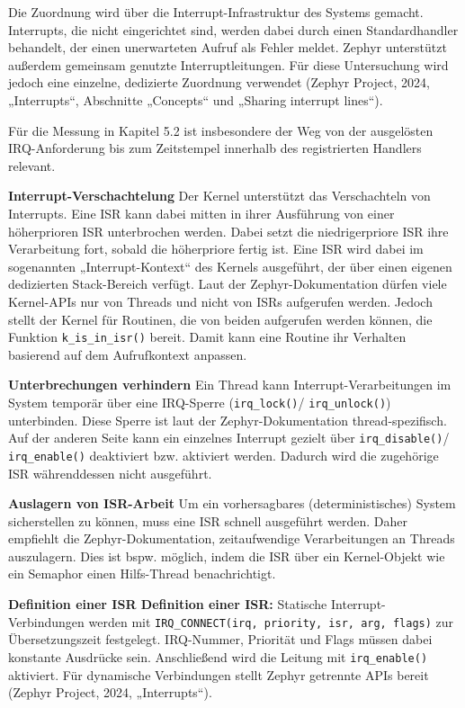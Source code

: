 Die Zuordnung wird über die Interrupt-Infrastruktur des Systems gemacht. Interrupts, die nicht eingerichtet sind, werden dabei durch einen Standardhandler behandelt, der einen unerwarteten Aufruf als Fehler meldet. Zephyr unterstützt außerdem gemeinsam genutzte Interruptleitungen. Für diese Untersuchung wird jedoch eine einzelne, dedizierte Zuordnung verwendet (Zephyr Project, 2024, „Interrupts“, Abschnitte „Concepts“ und „Sharing interrupt lines“).

Für die Messung in Kapitel 5.2 ist insbesondere der Weg von der ausgelösten IRQ-Anforderung bis zum Zeitstempel innerhalb des registrierten Handlers relevant.

\textbf{Interrupt-Verschachtelung }Der Kernel unterstützt das Verschachteln von Interrupts. Eine ISR kann dabei mitten in ihrer Ausführung von einer höherprioren ISR unterbrochen werden. Dabei setzt die niedrigerpriore ISR ihre Verarbeitung fort, sobald die höherpriore fertig ist. Eine ISR wird dabei im sogenannten „Interrupt-Kontext“ des Kernels ausgeführt, der über einen eigenen dedizierten Stack-Bereich verfügt. Laut der Zephyr-Dokumentation dürfen viele Kernel-APIs nur von Threads und nicht von ISRs aufgerufen werden. Jedoch stellt der Kernel für Routinen, die von beiden aufgerufen werden können, die Funktion \lstinline[style=fileinline]|k_is_in_isr()| bereit. Damit kann eine Routine ihr Verhalten basierend auf dem Aufrufkontext anpassen.

\textbf{Unterbrechungen verhindern }Ein Thread kann Interrupt-Verarbeitungen im System temporär über eine IRQ-Sperre (\lstinline[style=fileinline]|irq_lock()|/ \lstinline[style=fileinline]|irq_unlock()|) unterbinden. Diese Sperre ist laut der Zephyr-Dokumentation thread-spezifisch. Auf der anderen Seite kann ein einzelnes Interrupt gezielt über \lstinline[style=fileinline]|irq_disable()|/ \lstinline[style=fileinline]|irq_enable()| deaktiviert bzw. aktiviert werden. Dadurch wird die zugehörige ISR währenddessen nicht ausgeführt.

\textbf{Auslagern von ISR-Arbeit }Um ein vorhersagbares (deterministisches) System sicherstellen zu können, muss eine ISR schnell ausgeführt werden. Daher empfiehlt die Zephyr-Dokumentation, zeitaufwendige Verarbeitungen an Threads auszulagern. Dies ist bspw. möglich, indem die ISR über ein Kernel-Objekt wie ein Semaphor einen Hilfs-Thread benachrichtigt.

\textbf{Definition einer ISR Definition einer ISR:} Statische Interrupt-Verbindungen werden mit \lstinline[style=fileinline]|IRQ_CONNECT(irq, priority, isr, arg, flags)| zur Übersetzungszeit festgelegt. IRQ-Nummer, Priorität und Flags müssen dabei konstante Ausdrücke sein. Anschließend wird die Leitung mit \lstinline[style=fileinline]|irq_enable()| aktiviert. Für dynamische Verbindungen stellt Zephyr getrennte APIs bereit (Zephyr Project, 2024, „Interrupts“).

